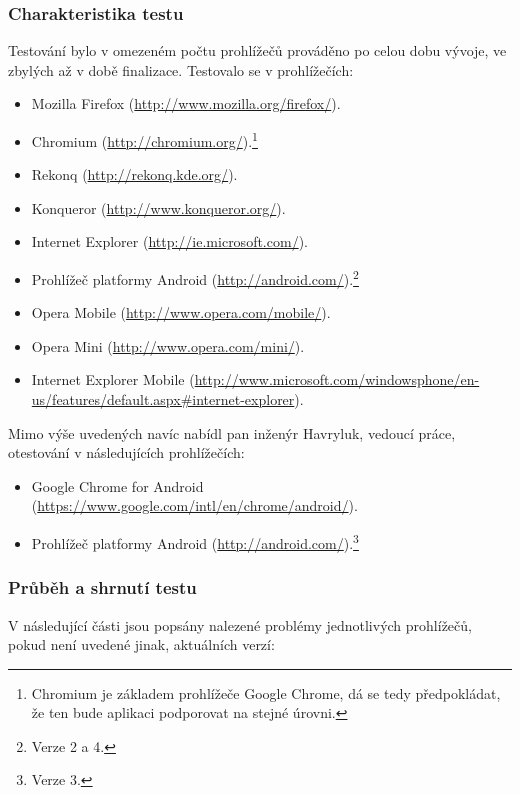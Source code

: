 \subsubsection{Charakteristika testu}
Testování bylo v omezeném počtu prohlížečů prováděno po celou dobu vývoje, ve zbylých až v době finalizace. Testovalo se v prohlížečích:
\begin{itemize}
 \item Mozilla Firefox (\url{http://www.mozilla.org/firefox/}).
 \item Chromium (\url{http://chromium.org/}).\footnote{Chromium je základem prohlížeče Google Chrome, dá se tedy předpokládat, že ten bude aplikaci podporovat na stejné úrovni.}
 \item Rekonq (\url{http://rekonq.kde.org/}).
 \item Konqueror (\url{http://www.konqueror.org/}).
 \item Internet Explorer (\url{http://ie.microsoft.com/}).
 \item Prohlížeč platformy Android (\url{http://android.com/}).\footnote{Verze 2 a 4.}
 \item Opera Mobile (\url{http://www.opera.com/mobile/}).
 \item Opera Mini (\url{http://www.opera.com/mini/}).
 \item Internet Explorer Mobile (\url{http://www.microsoft.com/windowsphone/en-us/features/default.aspx#internet-explorer}).
\end{itemize}
Mimo výše uvedených navíc nabídl pan inženýr Havryluk, vedoucí práce, otestování v následujících prohlížečích:
\begin{itemize}
 \item Google Chrome for Android (\url{https://www.google.com/intl/en/chrome/android/}).
 \item Prohlížeč platformy Android (\url{http://android.com/}).\footnote{Verze 3.}
\end{itemize}


\subsubsection{Průběh a shrnutí testu}
V následující části jsou popsány nalezené problémy jednotlivých prohlížečů, pokud není uvedené jinak, aktuálních verzí:
